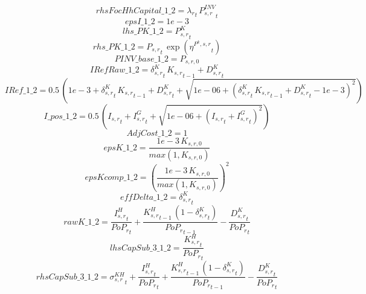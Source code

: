 \begin{dmath*}
rhsFocHhCapital\_1\_2 = {\lambda_r}_{t}\, {{P^{INV}_{s,r}}}_{t}
\end{dmath*}
\begin{dmath*}
epsI\_1\_2 = 1e-3
\end{dmath*}
\begin{dmath*}
lhs\_PK\_1\_2 = {{P^K_{s,r}}}_{t}
\end{dmath*}
\begin{dmath*}
rhs\_PK\_1\_2 = {{P_{s,r}}}_{t}\, \exp\left({{\eta^{P^k,s,r}}}_{t}\right)
\end{dmath*}
\begin{dmath*}
PINV\_base\_1\_2 = {{P_{s,r,0}}}
\end{dmath*}
\begin{dmath*}
IRefRaw\_1\_2 = {{\delta^{K}_{s,r}}}_{t}\, {{K_{s,r}}}_{t-1}+{{D^K_{s,r}}}_{t}
\end{dmath*}
\begin{dmath*}
IRef\_1\_2 = 0.5\, \left(1e-3+{{\delta^{K}_{s,r}}}_{t}\, {{K_{s,r}}}_{t-1}+{{D^K_{s,r}}}_{t}+\sqrt{1e-06+\left({{\delta^{K}_{s,r}}}_{t}\, {{K_{s,r}}}_{t-1}+{{D^K_{s,r}}}_{t}-1e-3\right)^{2}}\right)
\end{dmath*}
\begin{dmath*}
I\_pos\_1\_2 = 0.5\, \left({{I_{s,r}}}_{t}+{{I^G_{s,r}}}_{t}+\sqrt{1e-06+\left({{I_{s,r}}}_{t}+{{I^G_{s,r}}}_{t}\right)^{2}}\right)
\end{dmath*}
\begin{dmath*}
AdjCost\_1\_2 = 1
\end{dmath*}
\begin{dmath*}
epsK\_1\_2 = \frac{1e-3\, {{K_{s,r,0}}}}{max(1,{{K_{s,r,0}}})}
\end{dmath*}
\begin{dmath*}
epsKcomp\_1\_2 = \left(\frac{1e-3\, {{K_{s,r,0}}}}{max(1,{{K_{s,r,0}}})}\right)^{2}
\end{dmath*}
\begin{dmath*}
effDelta\_1\_2 = {{\delta^{K}_{s,r}}}_{t}
\end{dmath*}
\begin{dmath*}
rawK\_1\_2 = \frac{{{I^H_{s,r}}}_{t}}{{{PoP_r}}_{t}}+\frac{{{K^H_{s,r}}}_{t-1}\, \left(1-{{\delta^{K}_{s,r}}}_{t}\right)}{{{PoP_r}}_{t-1}}-\frac{{{D^K_{s,r}}}_{t}}{{{PoP_r}}_{t}}
\end{dmath*}
\begin{dmath*}
lhsCapSub\_3\_1\_2 = \frac{{{K^H_{s,r}}}_{t}}{{{PoP_r}}_{t}}
\end{dmath*}
\begin{dmath*}
rhsCapSub\_3\_1\_2 = {{\sigma^{KH}_{s,r}}}_{t}+\frac{{{I^H_{s,r}}}_{t}}{{{PoP_r}}_{t}}+\frac{{{K^H_{s,r}}}_{t-1}\, \left(1-{{\delta^{K}_{s,r}}}_{t}\right)}{{{PoP_r}}_{t-1}}-\frac{{{D^K_{s,r}}}_{t}}{{{PoP_r}}_{t}}
\end{dmath*}
